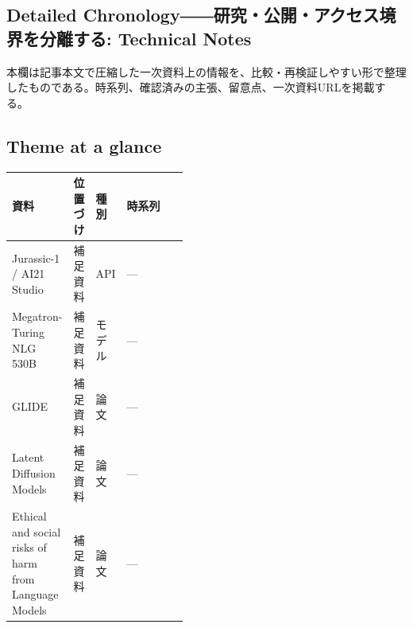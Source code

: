 \subsection*{Detailed Chronology――研究・公開・アクセス境界を分離する: Technical Notes}
本欄は記事本文で圧縮した一次資料上の情報を、比較・再検証しやすい形で整理したものである。時系列、確認済みの主張、留意点、一次資料URLを掲載する。
\medskip
\subsection*{Theme at a glance}
\begin{center}
\footnotesize
\begin{tabularx}{\linewidth}{@{}p{0.20\linewidth}p{0.10\linewidth}p{0.14\linewidth}X@{}}
\toprule
資料 & 位置づけ & 種別 & 時系列 \\
\midrule
Jurassic-1 / AI21 Studio & 補足資料 & API & — \\
Megatron-Turing NLG 530B & 補足資料 & モデル & — \\
GLIDE & 補足資料 & 論文 & — \\
Latent Diffusion Models & 補足資料 & 論文 & — \\
Ethical and social risks of harm from Language Models & 補足資料 & 論文 & — \\
\bottomrule
\end{tabularx}
\end{center}
\normalsize

